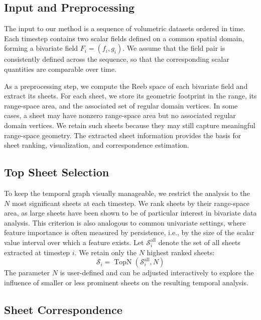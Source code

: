 \documentclass[review]{vgtc}                          %
\newcommand{\Sheets}{\mathcal{S}}
\begin{document}
\subsection{Input and Preprocessing}

The input to our method is a sequence of volumetric datasets ordered in time. Each timestep contains two scalar fields defined on a common spatial domain, forming a bivariate field $F_i=(f_i,g_i)$. We assume that the field pair is consistently defined across the sequence, so that the corresponding scalar quantities are comparable over time.

As a preprocessing step, we compute the Reeb space of each bivariate field and extract its sheets. For each sheet, we store its geometric footprint in the range, its range-space area, and the associated set of regular domain vertices. In some cases, a sheet may have nonzero range-space area but no associated regular domain vertices. We retain such sheets because they may still capture meaningful range-space geometry. The extracted sheet information provides the basis for sheet ranking, visualization, and correspondence estimation.



\subsection{Top Sheet Selection}

To keep the temporal graph visually manageable, we restrict the analysis to the $N$ most significant sheets at each timestep. We rank sheets by their range-space area, as large sheets have been shown to be of particular interest in bivariate data analysis. This criterion is also analogous to common univariate settings, where feature importance is often measured by persistence, i.e., by the size of the scalar value interval over which a feature exists. Let $\Sheets_i^\mathrm{all}$ denote the set of all sheets extracted at timestep $i$. We retain only the $N$ highest ranked sheets:
\[ \Sheets_i = \operatorname{TopN}(\Sheets_i^\mathrm{all}, N) \]
The parameter $N$ is user-defined and can be adjusted interactively to explore the influence of smaller or less prominent sheets on the resulting temporal analysis.





\subsection{Sheet Correspondence}
\end{document}

